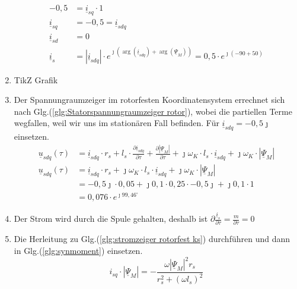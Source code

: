 \begin{solution}
\begin{enumerate}
\begin{align}
-0,5 &= \underline{i}_{sq} \cdot 1\\
\underline{i}_{sq} &= -0,5 = \underline{i}_{sdq} \\
\underline{i}_{sd} &= 0\\
\underline{i}_{s} &= |\underline{i}_{sdq}| \cdot e^{\jmath (\arg(\underline{i}_{sdq}) + \arg(\underline{\Psi}_{M}))}= 0,5 \cdot e^{\jmath ( -90 + 50)}
\end{align}
\item TikZ Grafik
\item Der Spannungraumzeiger im rotorfesten Koordinatensystem errechnet sich nach Glg.(\ref{glg:Statorspannungraumzeiger rotor}), wobei die partiellen Terme wegfallen, weil wir uns im station\"aren Fall befinden. F\"ur $\underline{i}_{sdq}= -0,5 \jmath$ einsetzen.
\begin{align}
\underline{u}_{sdq}(\tau) &= \underline{i}_{sdq} \cdot r_s + l_s \cdot \frac{\partial \underline{i}_{sdq}}{\partial \tau} + \frac{\partial |\underline{\Psi}_M|}{\partial \tau} + \jmath \omega_K \cdot l_s \cdot \underline{i}_{sdq} + \jmath \omega_K \cdot |\underline{\Psi}_M|\\
\underline{u}_{sdq}(\tau) &= \underline{i}_{sdq} \cdot r_s + \jmath \omega_K \cdot l_s \cdot \underline{i}_{sdq} + \jmath \omega_K \cdot |\underline{\Psi}_M|\\
&= -0,5 \jmath \cdot 0,05 + \jmath 0,1 \cdot 0,25 \cdot -0,5 \jmath+\jmath 0,1 \cdot 1\\
&=0,076 \cdot e^{\jmath 99,46^\circ}
\end{align}
\item Der Strom wird durch die Spule gehalten, deshalb ist $\partial \frac{\underline{i}_s}{\partial \tau} = \frac{m}{\partial \tau} = 0$
\item Die Herleitung zu Glg.(\ref{glg:stromzeiger rotorfest ks}) durchf\"uhren und dann in Glg.(\ref{glg:synmoment}) einsetzen.
\begin{equation}
i_{sq} \cdot | \underline{\Psi}_M| = -\frac{\omega |\underline{\Psi}_M|^2 r_s}{r_s^2 + (\omega l_s)^2}
\end{equation}
\end{enumerate}
\end{solution}
